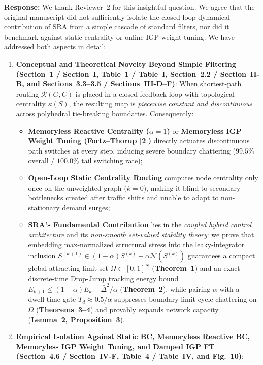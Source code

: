 \documentclass[11pt,a4paper]{article}
\begin{document}
\noindent\textbf{Response:} We thank Reviewer~2 for this insightful question. We agree that the original manuscript did not sufficiently isolate the closed-loop dynamical contribution of SRA from a simple cascade of standard filters, nor did it benchmark against static centrality or online IGP weight tuning. We have addressed both aspects in detail:
\begin{enumerate}[leftmargin=1.8em]
    \item \textbf{Conceptual and Theoretical Novelty Beyond Simple Filtering (Section~1 / Section~I, Table~1 / Table~I, Section~2.2 / Section~II-B, and Sections~3.3--3.5 / Sections~III-D--F)}:
    When shortest-path routing $\mathcal{R}(G, C)$ is placed in a closed feedback loop with topological centrality $\kappa(S)$, the resulting map is \textit{piecewise constant and discontinuous} across polyhedral tie-breaking boundaries. Consequently:
    \begin{itemize}
        \item \textbf{Memoryless Reactive Centrality ($\alpha=1$)} or \textbf{Memoryless IGP Weight Tuning (Fortz--Thorup [2])} directly actuates discontinuous path switches at every step, inducing severe boundary chattering ($99.5\%$ overall / $100.0\%$ tail switching rate);
        \item \textbf{Open-Loop Static Centrality Routing} computes node centrality only once on the unweighted graph ($k=0$), making it blind to secondary bottlenecks created after traffic shifts and unable to adapt to non-stationary demand surges;
        \item \textbf{SRA's Fundamental Contribution} lies in the \textit{coupled hybrid control architecture} and its \textit{non-smooth set-valued stability theory}: we prove that embedding max-normalized structural stress into the leaky-integrator inclusion $S^{(k+1)} \in (1-\alpha)S^{(k)} + \alpha\mathcal{N}(S^{(k)})$ guarantees a compact global attracting limit set $\Omega \subset [0,1]^N$ (\textbf{Theorem~1}) and an exact discrete-time Drop-Jump tracking energy bound $E_{k+1} \le (1-\alpha)E_k + \bar{\Delta}^2/\alpha$ (\textbf{Theorem~2}), while pairing $\alpha$ with a dwell-time gate $T_d \approx 0.5/\alpha$ suppresses boundary limit-cycle chattering on $\Omega$ (\textbf{Theorems~3--4}) and provably expands network capacity (\textbf{Lemma~2, Proposition~3}).
    \end{itemize}
    \item \textbf{Empirical Isolation Against Static BC, Memoryless Reactive BC, Memoryless IGP Weight Tuning, and Damped IGP FT (Section~4.6 / Section~IV-F, Table~4 / Table~IV, and Fig.~10)}:

\end{enumerate}
\end{document}
